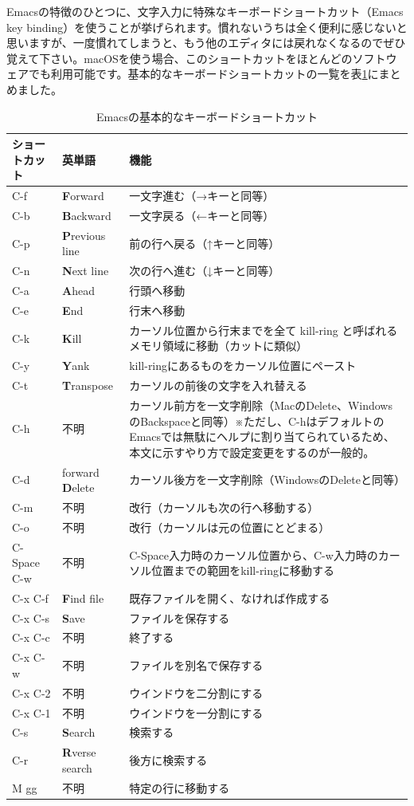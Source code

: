 Emacsの特徴のひとつに、文字入力に特殊なキーボードショートカット（Emacs key binding）を使うことが挙げられます。慣れないうちは全く便利に感じないと思いますが、一度慣れてしまうと、もう他のエディタには戻れなくなるのでぜひ覚えて下さい。macOSを使う場合、このショートカットをほとんどのソフトウェアでも利用可能です。基本的なキーボードショートカットの一覧を表\ref{tab_emacs}にまとめました。

\begin{table}
  \centering
  \caption{Emacsの基本的なキーボードショートカット}
  \label{tab_emacs}
  \begin{tabular}{llp{10cm}}
  \hline
ショートカット & 英単語 & 機能 \\ \hline\hline
C-f & {\bf F}orward & 一文字進む（→キーと同等） \\
C-b & {\bf B}ackward & 一文字戻る（←キーと同等） \\
C-p & {\bf P}revious line & 前の行へ戻る（↑キーと同等） \\
C-n & {\bf N}ext line & 次の行へ進む（↓キーと同等） \\
C-a & {\bf A}head & 行頭へ移動 \\
C-e & {\bf E}nd & 行末へ移動 \\
C-k & {\bf K}ill & カーソル位置から行末までを全て kill-ring と呼ばれるメモリ領域に移動（カットに類似） \\
C-y & {\bf Y}ank & kill-ringにあるものをカーソル位置にペースト \\
C-t & {\bf T}ranspose & カーソルの前後の文字を入れ替える \\
C-h & 不明 & カーソル前方を一文字削除（MacのDelete、WindowsのBackspaceと同等）※ただし、C-hはデフォルトのEmacsでは無駄にヘルプに割り当てられているため、本文に示すやり方で設定変更をするのが一般的。 \\
C-d & forward {\bf D}elete & カーソル後方を一文字削除（WindowsのDeleteと同等） \\
C-m & 不明 & 改行（カーソルも次の行へ移動する） \\
C-o & 不明 & 改行（カーソルは元の位置にとどまる） \\
C-Space C-w & 不明 & C-Space入力時のカーソル位置から、C-w入力時のカーソル位置までの範囲をkill-ringに移動する \\ \hline
C-x C-f & {\bf F}ind file & 既存ファイルを開く、なければ作成する \\
C-x C-s & {\bf S}ave & ファイルを保存する \\
C-x C-c & 不明 & 終了する \\
C-x C-w & 不明 & ファイルを別名で保存する \\
C-x C-2 & 不明 & ウインドウを二分割にする \\
C-x C-1 & 不明 & ウインドウを一分割にする \\
C-s & {\bf S}earch & 検索する \\
C-r & {\bf R}verse search & 後方に検索する \\
M gg & 不明 & 特定の行に移動する\\\hline
  \end{tabular}
\end{table}


